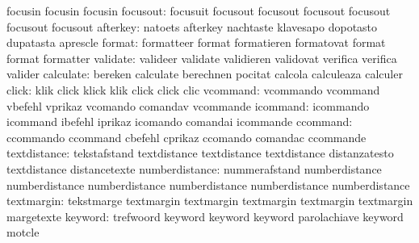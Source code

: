                            focusin                   focusin
                           focusin
                 focusout: focusuit                  focusout
                           focusout                  focusout
                           focusout                  focusout
                           focusout
                 afterkey: natoets                   afterkey
                           nachtaste                 klavesapo
                           dopotasto                 dupatasta
                           aprescle
                   format: formatteer                format
                           formatieren               formatovat
                           format                    format
                           formatter
                 validate: valideer                  validate
                           validieren                validovat
                           verifica                  verifica
                           valider
                calculate: bereken                   calculate
                           berechnen                 pocitat
                           calcola                   calculeaza
                           calculer
                    click: klik                      click
                           klick                     klik
                           click                     click
                           clic
                 vcommand: vcommando                 vcommand
                           vbefehl                   vprikaz
                           vcomando                  comandav
                           vcommande
                 icommand: icommando                 icommand
                           ibefehl                   iprikaz
                           icomando                  comandai
                           icommande
                 ccommand: ccommando                 ccommand
                           cbefehl                   cprikaz
                           ccomando                  comandac
                           ccommande
             textdistance: tekstafstand              textdistance
                           textdistance              textdistance
                           distanzatesto             textdistance
                           distancetexte
           numberdistance: nummerafstand             numberdistance
                           numberdistance            numberdistance
                           numberdistance            numberdistance
                           numberdistance
               textmargin: tekstmarge                textmargin
                           textmargin                textmargin
                           textmargin                textmargin
                           margetexte
                  keyword: trefwoord                 keyword
                           keyword                   keyword
                           parolachiave              keyword
                           motcle

